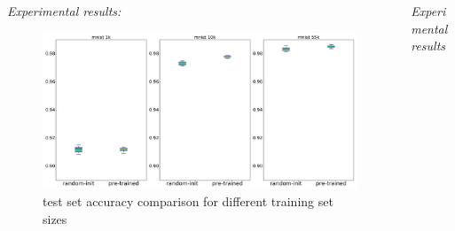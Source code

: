 \documentclass[final]{beamer}
\newlength{\onecolwid}
\newlength{\threecolwid}
\begin{document}
\begin{frame}[t]
\begin{columns}[t]
\begin{column}{\threecolwid}
\begin{columns}[t, totalwidth=\threecolwid]
\begin{column}{\onecolwid} %

\end{column}
\begin{column}{\onecolwid}

\end{column}

\begin{column}{\onecolwid}

\end{column}
\end{columns}

\begin{columns}[t, totalwidth=\threecolwid] %


\begin{column}{\onecolwid} %
\begin{block}{}
\emph{Experimental results:}

\begin{figure}
\includegraphics[width=\linewidth]{box_plots/boxplots_mnist.png}
\caption{test set accuracy comparison for different training set sizes}
\end{figure}

\end{block}
\end{column}
\begin{column}{\onecolwid}
\begin{block}{}
\emph{Experimental results}


\end{block}
\end{column}
\end{columns}
\end{column}
\end{columns}
\end{frame}
\end{document}
